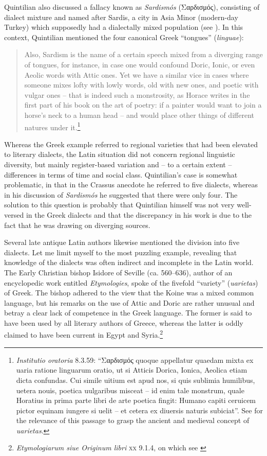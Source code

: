 Quintilian also discussed a fallacy known as \textit{Sardismós} (Σαρδισμός), consisting of dialect mixture and named after Sardis, a city in Asia Minor (modern-day Turkey) which supposedly had a dialectally mixed population (see \citealt{Gitner2019}). In this context, Quintilian mentioned the four canonical Greek “tongues” (\textit{linguae}):

\begin{quote}
Also, Sardism is the name of a certain speech mixed from a diverging range of tongues, for instance, in case one would confound Doric, Ionic, or even Aeolic words with Attic ones. Yet we have a similar vice in cases where someone mixes lofty with lowly words, old with new ones, and poetic with vulgar ones – that is indeed such a monstrosity, as Horace writes in the first part of his book on the art of poetry: if a painter would want to join a horse’s neck to a human head – and would place other things of different natures under it.\footnote{\textit{Institutio oratoria} {8.3.59: “Σαρδισμός quoque appellatur quaedam mixta ex uaria ratione linguarum oratio, ut si Atticis Dorica, Ionica, Aeolica etiam dicta confundas. Cui simile uitium est apud nos, si quis sublimia humilibus, uetera nouis, poetica uulgaribus misceat – id enim tale monstrum, quale Horatius in prima parte libri de arte poetica fingit: Humano capiti ceruicem pictor equinam iungere si uelit – et cetera ex diuersis naturis subiciat”. See \citet[46]{Carruthers2009} for the relevance of this passage to grasp the ancient and medieval concept of} {\textit{uarietas}}.}
\end{quote}

Whereas the Greek example referred to regional varieties that had been elevated to literary dialects, the Latin situation did not concern regional linguistic diversity, but mainly register-based variation and – to a certain extent – differences in terms of time and social class. Quintilian’s case is somewhat problematic, in that in the Crassus anecdote he referred to five dialects, whereas in his discussion of \textit{Sardismós} he suggested that there were only four. The solution to this question is probably that Quintilian himself was not very well-versed in the Greek dialects and that the discrepancy in his work is due to the fact that he was drawing on diverging sources.

Several late antique Latin authors likewise mentioned the division into five dialects. Let me limit myself to the most puzzling example, revealing that knowledge of the dialects was often indirect and incomplete in the Latin world. The Early Christian bishop Isidore of Seville (ca. 560–636), author of an encyclopedic work entitled \textit{Etymologies}, spoke of the fivefold “variety” (\textit{uarietas}) of Greek. The bishop adhered to the view that the Koine was a mixed common language, but his remarks on the use of Attic and Doric are rather unusual and betray a clear lack of competence in the Greek language. The former is said to have been used by all literary authors of Greece, whereas the latter is oddly claimed to have been current in Egypt and Syria.\footnote{\textit{Etymologiarum siue Originum libri} \textsc{xx} 9.1.4, on which see \citet[227–229]{Denecker2017}}

